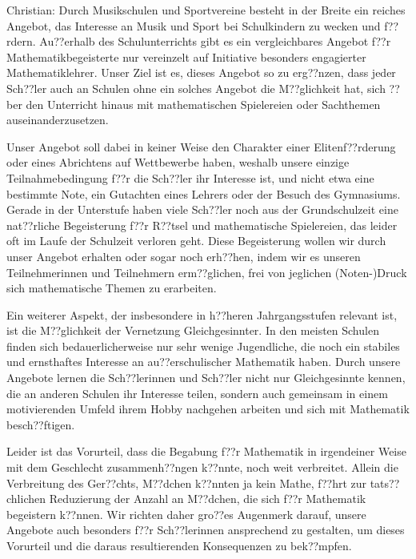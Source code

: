 \documentclass[12pt]{zettel}
\begin{document}
\begin{small}
Christian:
Durch Musikschulen und Sportvereine besteht in der Breite ein reiches Angebot,
das Interesse an Musik und Sport bei Schulkindern zu wecken und f??rdern.
Au??erhalb des Schulunterrichts gibt es ein vergleichbares Angebot f??r
Mathematikbegeisterte nur vereinzelt auf
Initiative besonders engagierter Mathematiklehrer. Unser Ziel ist es, dieses
Angebot so zu erg??nzen, dass jeder Sch??ler auch an Schulen ohne ein solches
Angebot die M??glichkeit hat, sich ??ber den Unterricht hinaus mit
mathematischen Spielereien oder Sachthemen
auseinanderzusetzen.

Unser Angebot soll dabei in keiner Weise den Charakter einer Elitenf??rderung
oder eines Abrichtens auf Wettbewerbe haben, weshalb unsere einzige
Teilnahmebedingung f??r die Sch??ler ihr Interesse ist, und nicht etwa eine
bestimmte Note, ein Gutachten eines Lehrers
oder der Besuch des Gymnasiums. Gerade in der Unterstufe haben viele Sch??ler
noch aus der Grundschulzeit eine nat??rliche Begeisterung f??r R??tsel und
mathematische Spielereien, das leider oft im Laufe der Schulzeit verloren geht.
Diese Begeisterung wollen wir
durch unser Angebot erhalten oder sogar noch erh??hen, indem wir es unseren
Teilnehmerinnen und Teilnehmern erm??glichen, frei von jeglichen (Noten-)Druck
sich mathematische Themen zu erarbeiten.

Ein weiterer Aspekt, der insbesondere in h??heren Jahrgangsstufen relevant ist,
ist die M??glichkeit der Vernetzung Gleichgesinnter. In den meisten Schulen
finden sich bedauerlicherweise nur sehr wenige Jugendliche, die noch ein
stabiles und ernsthaftes Interesse an
au??erschulischer Mathematik haben. Durch unsere Angebote lernen die
Sch??lerinnen und Sch??ler nicht nur Gleichgesinnte kennen, die an anderen
Schulen ihr Interesse teilen, sondern auch gemeinsam in einem motivierenden
Umfeld ihrem Hobby nachgehen arbeiten und
sich mit Mathematik besch??ftigen.

Leider ist das Vorurteil, dass die Begabung f??r Mathematik in irgendeiner
Weise mit dem Geschlecht zusammenh??ngen k??nnte, noch weit verbreitet. Allein
die Verbreitung des Ger??chts, M??dchen k??nnten ja kein Mathe, f??hrt zur
tats??chlichen Reduzierung der Anzahl
an M??dchen, die sich f??r Mathematik begeistern k??nnen. Wir richten daher
gro??es Augenmerk darauf, unsere Angebote auch besonders f??r Sch??lerinnen
ansprechend zu gestalten, um dieses Vorurteil und die daraus resultierenden
Konsequenzen zu bek??mpfen.
\end{small}
\end{document}
